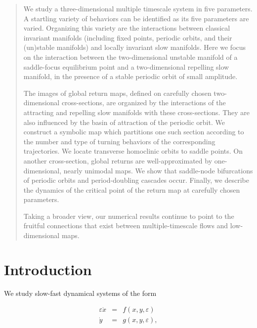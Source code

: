 \documentclass[aip, cha, sd, amsmath,amssymb, preprint]{revtex4-1}
\begin{document}
\begin{quotation}
We study a three-dimensional multiple timescale system in five parameters. A startling variety of behaviors can be identified as its five parameters are varied. Organizing this variety are the interactions between classical invariant manifolds (including fixed points, periodic orbits, and their (un)stable manifolds) and locally invariant slow manifolds. Here we focus on the interaction between the two-dimensional unstable manifold of a saddle-focus equilibrium point and a two-dimensional repelling slow manifold, in the presence of a stable periodic orbit of small amplitude.

 The images of global return maps, defined on carefully chosen two-dimensional cross-sections, are organized by the interactions of the attracting and repelling slow manifolds with these cross-sections. They are also influenced by the basin of attraction of the periodic orbit. We construct a symbolic map which partitions one such section according to the number and type of turning behaviors of the corresponding trajectories. We locate transverse homoclinic orbits to saddle points. On another cross-section, global returns are well-approximated by one-dimensional, nearly unimodal maps.  We show that saddle-node bifurcations of periodic orbits and period-doubling cascades occur.  Finally, we describe the dynamics of the critical point of the return map at carefully chosen parameters. 

Taking a broader view, our numerical results continue to point to the fruitful connections that exist between multiple-timescale flows and low-dimensional maps.
\end{quotation}

\section{\label{sec:intro} Introduction}

We study slow-fast dynamical systems of the form

\begin{eqnarray*}
{ \varepsilon}\dot{x} &=& f(x,y,{ \varepsilon})\\
\dot{y} &=& g(x,y,{ \varepsilon}),
\end{eqnarray*}
\end{document}
